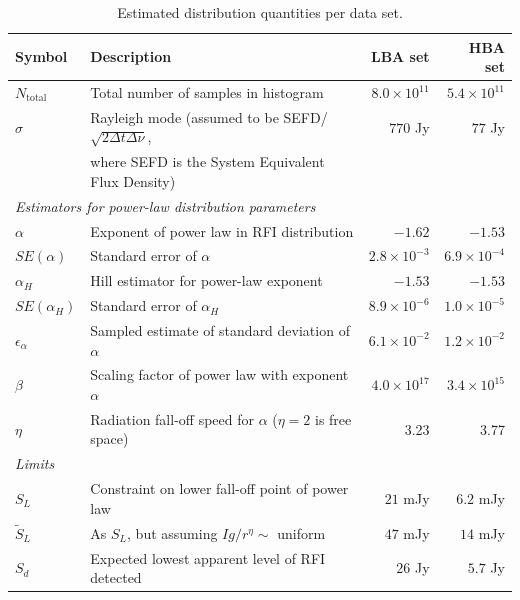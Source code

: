 \documentclass[useAMS,usenatbib]{mn2e}
\begin{document}
\begin{table}
\centering
\begin{minipage}{12cm}
\caption{Estimated distribution quantities per data set. }\label{table:dist-data-quantities}
\begin{tabular}{@{}llrr@{}}
\textbf{Symbol} & \textbf{Description} & \textbf{LBA set}& \textbf{HBA set} \\
\hline
\hline
$N_\textrm{total}$ & Total number of samples in histogram & $8.0\times10^{11}$ & $5.4\times10^{11}$ \\
$\sigma$ & Rayleigh mode (assumed to be SEFD/$\sqrt{2\Delta t \Delta \nu}$, & $770$ Jy & $77$ Jy \\
 & where SEFD is the System Equivalent Flux Density) & & \\
\hline
\multicolumn{4}{l}{\textit{Estimators for power-law distribution parameters}} \\
\hline
$\alpha$ & Exponent of power law in RFI distribution      & $-1.62$ & $-1.53$ \\ %
$SE(\alpha)$ & Standard error of $\alpha$ & $2.8 \times 10^{-3}$ & $6.9 \times 10^{-4}$ \\
$\alpha_H$ & Hill estimator for power-law exponent & $-1.53$ & $-1.53$ \\
$SE(\alpha_H)$ & Standard error of $\alpha_H$ & $8.9 \times 10^{-6}$ & $1.0\times10^{-5}$ \\
$\epsilon_{\alpha}$ & Sampled estimate of standard deviation of $\alpha$ & $6.1 \times 10^{-2}$ & $1.2 \times 10^{-2}$ \\
$\beta$ & Scaling factor of power law with exponent $\alpha$ & $4.0 \times 10^{17}$ & $3.4\times 10^{15}$ \\
$\eta$ & Radiation fall-off speed for $\alpha$ ($\eta=2$ is free space) & 3.23 & 3.77 \\
\hline
\multicolumn{4}{l}{\textit{Limits}} \\
\hline
$S_L$ & Constraint on lower fall-off point of power law & $21$ mJy & $6.2$ mJy \\ %
$\tilde{S}_L$ & As $S_L$, but assuming $Ig/r^\eta\sim$ uniform & $47$ mJy & $14$ mJy \\ %
$S_d$ & Expected lowest apparent level of RFI detected & $26$ Jy & $5.7$ Jy\\ %

\end{tabular}
\end{minipage}
\end{table}
\end{document}
